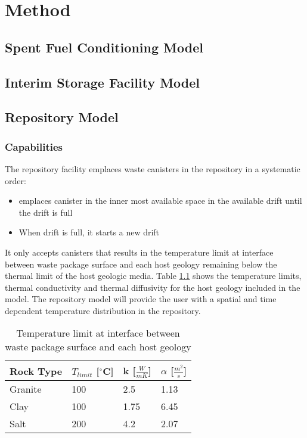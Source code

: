 \chapter{Method}

\section{Spent Fuel Conditioning Model}

\section{Interim Storage Facility Model}

\section{Repository Model}

\subsection{Capabilities}
The repository facility emplaces waste canisters in the repository 
in a systematic order: 
\begin{itemize}
    \item emplaces canister in the inner most available space 
    in the available drift until the drift is full 
    \item When drift is full, it starts a new drift
\end{itemize}
It only accepts canisters that results in the temperature limit at
interface between waste package surface and each host geology 
remaining below the thermal limit of the host geologic media. 
Table \ref{tab:temp_limit} shows the temperature limits, thermal 
conductivity and thermal diffusivity for the host geology included 
in the model. 
The repository model will provide the user with a spatial and time 
dependent temperature distribution in the repository. 

\begin{table}[h]
    \centering
	\label{tab:temp_limit}
    \caption{Temperature limit at interface between waste package 
    surface and each host geology \cite{sutton_investigations_2011}}
	\begin{tabular}{|l|l|l|l|}
	\hline
	Rock Type & $T_{limit}$ [$^\circ$C] & k [$\frac{W}{mK}$] &  $\alpha$ [$\frac{m^2}{s}$]  \\ \hline
	Granite   & 100 & 2.5  & 1.13\\ \hline
	Clay      & 100 & 1.75 & 6.45\\ \hline
	Salt      & 200 & 4.2  & 2.07\\ \hline
	\end{tabular}
\end{table}

